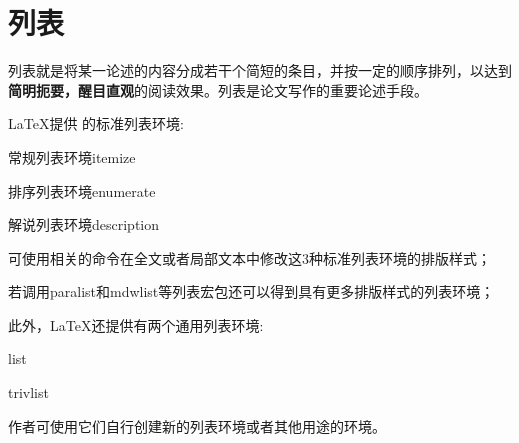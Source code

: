 \chapter{列表}%

列表就是将某一论述的内容分成若干个简短的条目，并按一定的顺序排列，以达到{\bf 简明扼要，醒目直观}的阅读效果。列表是论文写作的重要论述手段。

\LaTeX{\tiny 提供}%
的标准列表环境:
\begin{compactitem}
  \item
  常规列表环境{itemize}%
\item
  排序列表环境{enumerate}%
\item
  解说列表环境{description}%
\end{compactitem}

可使用相关的命令在全文或者局部文本中修改这3种标准列表环境的排版样式；
 
若调用paralist和mdwlist等列表宏包还可以得到具有更多排版样式的列表环境；

此外，LaTeX还提供有两个通用列表环境:
\begin{compactitem}
\item list
\item trivlist
\end{compactitem}
作者可使用它们自行创建新的列表环境或者其他用途的环境。